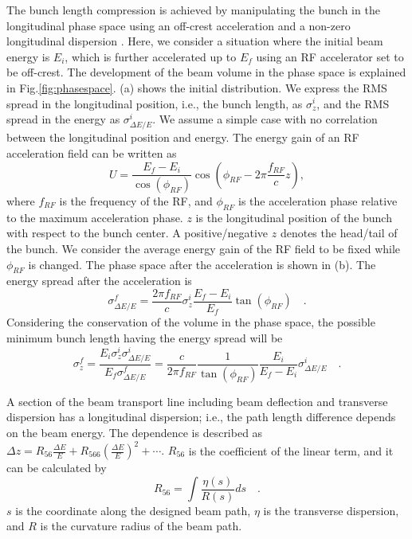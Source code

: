 \documentclass[review]{elsarticle}
\begin{document}
The bunch length compression
is achieved by manipulating the bunch in the longitudinal phase space
using an off-crest acceleration and a non-zero longitudinal dispersion
\cite{handbook} \cite{ipac_shimada} \cite{ipac_nakamura} \cite{linac_piot}.
Here, we consider a situation where
the initial beam energy is $E_i$,
which is further accelerated up to $E_f$ using an RF accelerator set to be off-crest.
The development of the beam volume in the phase space
is explained in Fig.\ref{fig:phasespace}.
(a) shows the initial distribution.
We express the RMS spread in the longitudinal position, i.e., the bunch length,
as $\sigma_z^i$,
and the RMS spread in the energy as $\sigma_{{\Delta E}/{E}}^i$.
We assume a simple case 
with no correlation between
the longitudinal position and energy.
The energy gain of an RF acceleration field can be written as
\begin{equation}
U = \frac{E_f-E_i}{\cos(\phi_{RF})}\cos(\phi_{RF} - 2\pi \frac{f_{RF}}{c} z) ,
\end{equation}
where $f_{RF}$ is the frequency of the RF,
and $\phi_{RF}$ is the acceleration phase relative to the maximum acceleration phase.
$z$ is the longitudinal position of the bunch
with respect to the bunch center.
A positive/negative $z$ denotes the head/tail of the bunch.
We consider the average energy gain of the RF field to be fixed
while $\phi_{RF}$ is changed.
The phase space after the acceleration is shown in (b).
The energy spread after the acceleration is
\begin{equation}
\sigma_{\Delta E/E}^f = 
\frac{2 \pi f_{RF}}{c}
\sigma_z^i \frac{E_f-E_i}{E_f} \tan (\phi_{RF}) \quad .
\end{equation}
%
Considering the conservation of the volume in the phase space,
the possible minimum bunch length
having the energy spread will be
\begin{equation}
\sigma_z^f = \frac{ E_i \sigma_z^i \sigma_{\Delta E/E}^i}{E_f \sigma_{\Delta E/E}^f}
=
\frac{c}{2 \pi f_{RF}} \frac{1}{\tan(\phi_{RF})} \frac{E_i}{E_f-E_i} \sigma_{\Delta E/E}^i
\quad .
\label{eq:minimumbunch}
\end{equation}

A section of the beam transport line including beam deflection 
and transverse dispersion
has a longitudinal dispersion;
i.e.,
the path length difference depends on the beam energy.
The dependence is described as
$
\Delta z = R_{56} \frac{\Delta E}{E} + R_{566} \left( \frac{\Delta E}{E}\right)^2 + \cdots .
$
$R_{56}$ is the coefficient of the linear term,
and it can be calculated by
\begin{equation}
R_{56} = \int \frac{\eta(s)}{R(s)} ds \quad .
\end{equation}
$s$ is the coordinate along the designed beam path,
$\eta$ is the transverse dispersion,
and $R$ is the curvature radius of the beam path.
 
\end{document}
